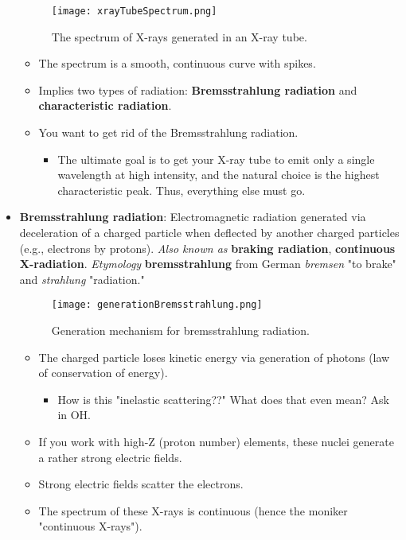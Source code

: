 \documentclass[../notes.tex]{subfiles}
\begin{document}
\begin{itemize}
\begin{figure}[H]
        \texttt{[image: xrayTubeSpectrum.png]}
        \caption{The spectrum of X-rays generated in an X-ray tube.}
        \label{fig:xrayTubeSpectrum}
    \end{figure}
    \begin{itemize}
        \item The spectrum is a smooth, continuous curve with spikes.
        \item Implies two types of radiation: \textbf{Bremsstrahlung radiation} and \textbf{characteristic radiation}.
        \item You want to get rid of the Bremsstrahlung radiation.
        \begin{itemize}
            \item The ultimate goal is to get your X-ray tube to emit only a single wavelength at high intensity, and the natural choice is the highest characteristic peak. Thus, everything else must go.
        \end{itemize}
    \end{itemize}
    \item \textbf{Bremsstrahlung radiation}: Electromagnetic radiation generated via deceleration of a charged particle when deflected by another charged particles (e.g., electrons by protons). \emph{Also known as} \textbf{braking radiation}, \textbf{continuous X-radiation}. \emph{Etymology} \textbf{bremsstrahlung} from German \emph{bremsen} "to brake" and \emph{strahlung} "radiation."
    \begin{figure}[h!]
        \centering
        \texttt{[image: generationBremsstrahlung.png]}
        \caption{Generation mechanism for bremsstrahlung radiation.}
        \label{fig:generationBremsstrahlung}
    \end{figure}
    \begin{itemize}
        \item The charged particle loses kinetic energy via generation of photons (law of conservation of energy).
        \begin{itemize}
            \item How is this "inelastic scattering??" What does that even mean? Ask in OH.
        \end{itemize}
        \item If you work with high-Z (proton number) elements, these nuclei generate a rather strong electric fields.
        \item Strong electric fields scatter the electrons.
        \item The spectrum of these X-rays is continuous (hence the moniker "continuous X-rays").

\end{itemize}
\end{itemize}
\end{document}
